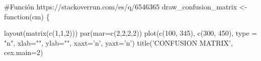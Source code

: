 \documentclass[
]{article}
\newenvironment{Shaded}{\begin{snugshade}}{\end{snugshade}}
\newcommand{\CommentTok}[1]{\textcolor[rgb]{0.50,0.62,0.50}{#1}}
\newcommand{\ControlFlowTok}[1]{\textcolor[rgb]{0.94,0.87,0.69}{#1}}
\newcommand{\DataTypeTok}[1]{\textcolor[rgb]{0.87,0.87,0.75}{#1}}
\newcommand{\DecValTok}[1]{\textcolor[rgb]{0.86,0.86,0.80}{#1}}
\newcommand{\KeywordTok}[1]{\textcolor[rgb]{0.94,0.87,0.69}{#1}}
\newcommand{\NormalTok}[1]{\textcolor[rgb]{0.80,0.80,0.80}{#1}}
\newcommand{\StringTok}[1]{\textcolor[rgb]{0.80,0.58,0.58}{#1}}
\begin{document}
\begin{Shaded}
\begin{Highlighting}[]
\CommentTok{#Función https://stackoverrun.com/es/q/6546365}
\NormalTok{draw_confusion_matrix <-}\StringTok{ }\ControlFlowTok{function}\NormalTok{(cm) \{}

     \KeywordTok{layout}\NormalTok{(}\KeywordTok{matrix}\NormalTok{(}\KeywordTok{c}\NormalTok{(}\DecValTok{1}\NormalTok{,}\DecValTok{1}\NormalTok{,}\DecValTok{2}\NormalTok{)))}
     \KeywordTok{par}\NormalTok{(}\DataTypeTok{mar=}\KeywordTok{c}\NormalTok{(}\DecValTok{2}\NormalTok{,}\DecValTok{2}\NormalTok{,}\DecValTok{2}\NormalTok{,}\DecValTok{2}\NormalTok{))}
     \KeywordTok{plot}\NormalTok{(}\KeywordTok{c}\NormalTok{(}\DecValTok{100}\NormalTok{, }\DecValTok{345}\NormalTok{), }\KeywordTok{c}\NormalTok{(}\DecValTok{300}\NormalTok{, }\DecValTok{450}\NormalTok{), }\DataTypeTok{type =} \StringTok{"n"}\NormalTok{, }\DataTypeTok{xlab=}\StringTok{""}\NormalTok{, }\DataTypeTok{ylab=}\StringTok{""}\NormalTok{, }\DataTypeTok{xaxt=}\StringTok{'n'}\NormalTok{, }\DataTypeTok{yaxt=}\StringTok{'n'}\NormalTok{)}
     \KeywordTok{title}\NormalTok{(}\StringTok{'CONFUSION MATRIX'}\NormalTok{, }\DataTypeTok{cex.main=}\DecValTok{2}\NormalTok{)}


\end{Highlighting}
\end{Shaded}
\end{document}
